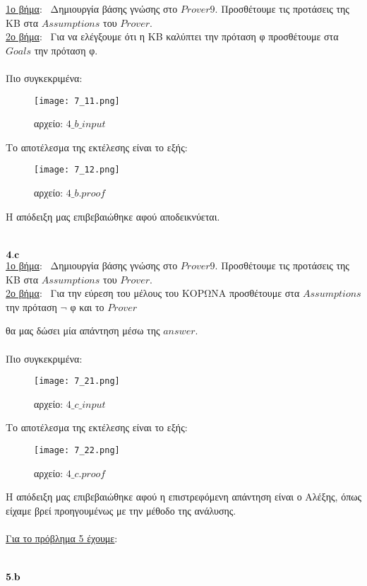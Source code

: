 \documentclass[10pt]{article}
\begin{document}
\underline{1ο βήμα}: \ Δημιουργία βάσης γνώσης στο $Prover9$. Προσθέτουμε τις προτάσεις της ΚΒ στα $Assumptions$ του $Prover$. \\ 

\underline{2ο βήμα}: \ Για να ελέγξουμε ότι η ΚΒ καλύπτει την πρόταση φ προσθέτουμε στα $Goals$ την πρόταση φ. \\ \\ 
Πιο συγκεκριμένα:
\begin{figure}[H]
    \texttt{[image: 7\_11.png]}\\
    \caption{αρχείο: $4\_b\_input$ }
\end{figure} 
Το αποτέλεσμα της εκτέλεσης είναι το εξής:
\begin{figure}[H]
    \texttt{[image: 7\_12.png]}\\
    \caption{αρχείο: $4\_b.proof$ }
\end{figure} 
Η απόδειξη μας επιβεβαιώθηκε αφού αποδεικνύεται.
 \\ \\ \\
$\bf 4.c$ \\

\underline{1ο βήμα}: \ Δημιουργία βάσης γνώσης στο $Prover9$. Προσθέτουμε τις προτάσεις της ΚΒ στα $Assumptions$ του $Prover$. \\ 

\underline{2ο βήμα}: \ Για την εύρεση του μέλους του ΚΟΡΩΝΑ προσθέτουμε στα $Assumptions$ την πρόταση $\neg$ φ και το $Prover$ 

\hspace{15mm}θα μας δώσει μία απάντηση μέσω της $answer$. \\ \\ 
Πιο συγκεκριμένα:
\begin{figure}[H]
    \texttt{[image: 7\_21.png]}\\
    \caption{αρχείο: $4\_c\_input$ }
\end{figure} 
Το αποτέλεσμα της εκτέλεσης είναι το εξής:
\begin{figure}[H]
    \texttt{[image: 7\_22.png]}\\
    \caption{αρχείο: $4\_c.proof$ }
\end{figure} Η απόδειξη μας επιβεβαιώθηκε αφού η επιστρεφόμενη απάντηση είναι ο Αλέξης, όπως είχαμε βρεί προηγουμένως με την μέθοδο της ανάλυσης. \\ \\
\underline{\underline{Για το πρόβλημα 5 έχουμε}}: \\ \\ \\
$\bf 5.b$ \\
\end{document}
